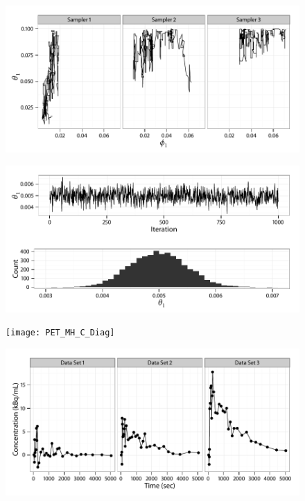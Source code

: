 \documentclass[11pt, fontset=Minion]{mthesis}
\begin{document}
\begin{figure}
  \includegraphics[width=\linewidth]{PET_MH_H_Path}
\end{figure}

\begin{figure}
  \includegraphics[width=\linewidth]{PET_MH_Diag}
\end{figure}

\begin{figure}
  \texttt{[image: PET\_MH\_C\_Diag]}
\end{figure}

\begin{figure}
  \includegraphics[width=\linewidth]{Typical_PET}
\end{figure}
\end{document}
